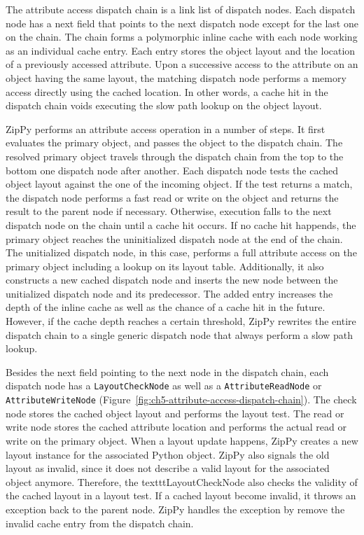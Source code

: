 The attribute access dispatch chain is a link list of dispatch nodes.
Each dispatch node has a \textsf{next} field that points to the next dispatch node except for the last one on the chain.
The chain forms a polymorphic inline cache with each node working as an individual cache entry.
Each entry stores the object layout and the location of a previously accessed attribute.
Upon a successive access to the attribute on an object having the same layout, the matching dispatch node performs a memory access directly using the cached location.
In other words, a cache hit in the dispatch chain voids executing the slow path lookup on the object layout.

ZipPy performs an attribute access operation in a number of steps.
It first evaluates the primary object, and passes the object to the dispatch chain.
The resolved primary object travels through the dispatch chain from the top to the bottom one dispatch node after another.
Each dispatch node tests the cached object layout against the one of the incoming object.
If the test returns a match, the dispatch node performs a fast read or write on the object and returns the result to the parent node if necessary.
Otherwise, execution falls to the next dispatch node on the chain until a cache hit occurs.
If no cache hit happends, the primary object reaches the uninitialized dispatch node at the end of the chain.
The unitialized dispatch node, in this case, performs a full attribute access on the primary object including a lookup on its layout table.
Additionally, it also constructs a new cached dispatch node and inserts the new node between the unitialized dispatch node and its predecessor.
The added entry increases the depth of the inline cache as well as the chance of a cache hit in the future.
However, if the cache depth reaches a certain threshold, ZipPy rewrites the entire dispatch chain to a single generic dispatch node that always perform a slow path lookup.

Besides the \textsf{next} field pointing to the next node in the dispatch chain, each dispatch node has a \texttt{LayoutCheckNode} as well as a \texttt{AttributeReadNode} or \texttt{AttributeWriteNode} (Figure~\ref{fig:ch5-attribute-access-dispatch-chain}).
The \textsf{check} node stores the cached object layout and performs the layout test.
The \textsf{read} or \textsf{write} node stores the cached attribute location and performs the actual read or write on the primary object.
When a layout update happens, ZipPy creates a new layout instance for the associated Python object.
ZipPy also signals the old layout as invalid, since it does not describe a valid layout for the associated object anymore.
Therefore, the texttt{LayoutCheckNode} also checks the validity of the cached layout in a layout test.
If a cached layout become invalid, it throws an exception back to the parent node.
ZipPy handles the exception by remove the invalid cache entry from the dispatch chain.

